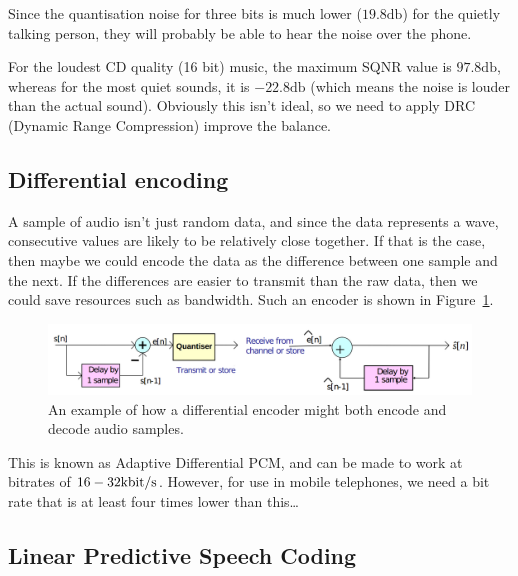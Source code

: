 Since the quantisation noise for three bits is much lower ($19.8\si{\decibel}$)
for the quietly talking person, they will probably be able to hear the noise
over the phone.

For the loudest CD quality (16 bit) music, the maximum SQNR value is
$97.8\si{\decibel}$, whereas for the most quiet sounds, it is
$-22.8\si{\decibel}$ (which means the noise is louder than the actual sound).
Obviously this isn't ideal, so we need to apply DRC (Dynamic Range Compression)
improve the balance.

\subsection{Differential encoding}

A sample of audio isn't just random data, and since the data represents a wave,
consecutive values are likely to be relatively close together. If that is the
case, then maybe we could encode the data as the difference between one sample
and the next. If the differences are easier to transmit than the raw data, then
we could save resources such as bandwidth. Such an encoder is shown in
Figure~\ref{differential-encoder}.

\begin{figure}
  \centering
  \includegraphics[width=\textwidth]{images/differential-encoder}
  \caption{An example of how a differential encoder might both encode and decode
  audio samples.}
  \label{differential-encoder}
\end{figure}


This is known as Adaptive Differential PCM, and can be made to work at bitrates
of $16-32\si{\kilo\bit\per\second}$. However, for use in mobile telephones, we
need a bit rate that is at least four times lower than this\dots

\subsection{Linear Predictive Speech Coding}


